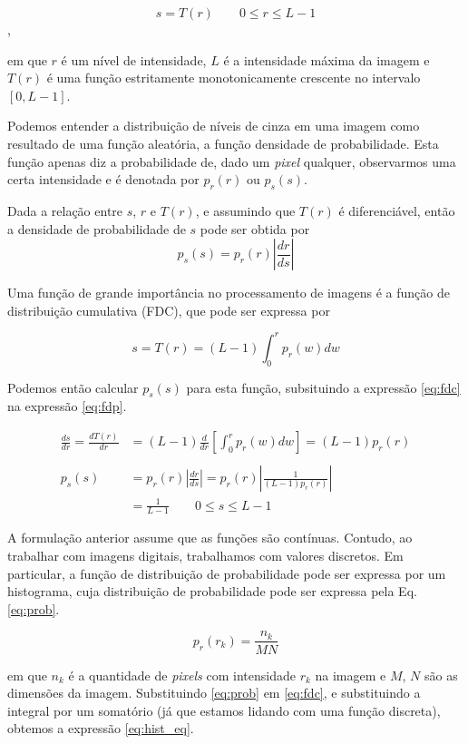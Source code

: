 \documentclass[10pt,a4paper]{article}
\newcommand{\pixel}{\textit{pixel} }
\newcommand{\pixels}{\textit{pixels} }
\begin{document}
\[ s = T(r) \qquad 0 \le r \le L -1 \],

em que $r$ é um nível de intensidade, $L$ é a intensidade máxima da imagem e $T(r)$ é uma função estritamente monotonicamente crescente no intervalo $[0, L-1]$. 

Podemos entender a distribuição de níveis de cinza em uma imagem como resultado de uma função aleatória, a função densidade de probabilidade. Esta função apenas diz a probabilidade de, dado um \pixel qualquer, observarmos uma certa intensidade e é denotada por $p_r(r)$ ou $p_s(s)$.

Dada a relação entre $s$, $r$ e $T(r)$, e assumindo que $T(r)$ é diferenciável, então a densidade de probabilidade de $s$ pode ser obtida por
\begin{equation}
    p_s(s) = p_r(r)\left|\frac{dr}{ds}\right|
    \label{eq:fdp}
\end{equation}

Uma função de grande importância no processamento de imagens é a função de distribuição cumulativa (FDC), que pode ser expressa por

\begin{equation}
    s = T(r) = (L-1) \int_0^r p_r(w)dw
    \label{eq:fdc}
\end{equation}

Podemos então calcular $p_s(s)$ para esta função, subsituindo a expressão \ref{eq:fdc} na expressão \ref{eq:fdp}.

\begin{align*}
    \frac{ds}{dr} = \frac{dT(r)}{dr} &= (L-1) \frac{d}{dr} \left[\int_0^r p_r(w)dw \right] = (L-1) p_r(r) \\
    \\
    p_s(s) &= p_r(r) \left|\frac{dr}{ds}\right| = p_r(r) \left|\frac{1}{(L-1)p_r(r)}\right|\\
           &= \frac{1}{L-1} \qquad 0 \le s \le L-1
\end{align*}

A formulação anterior assume que as funções são contínuas. Contudo, ao trabalhar com imagens digitais, trabalhamos com valores discretos. Em particular, a função de distribuição de probabilidade pode ser expressa por um histograma, cuja distribuição de probabilidade pode ser expressa pela Eq. \ref{eq:prob}.

\begin{equation}
    p_r(r_k) = \frac{n_k}{MN}
    \label{eq:prob}
\end{equation}

em que $n_k$ é a quantidade de \pixels com intensidade $r_k$ na imagem e $M$, $N$ são as dimensões da imagem. Substituindo \ref{eq:prob} em \ref{eq:fdc}, e substituindo a integral por um somatório (já que estamos lidando com uma função discreta), obtemos a expressão \ref{eq:hist_eq}.
\end{document}
